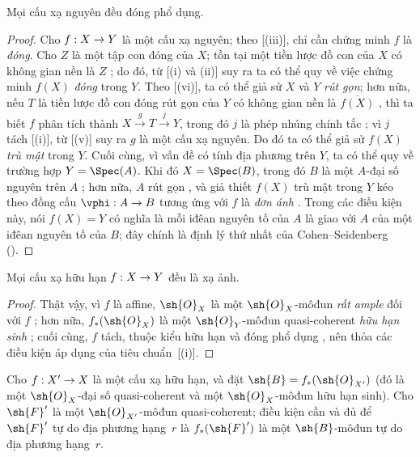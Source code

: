\documentclass[oneside,10pt]{amsart}
\makeatletter
\newcommand{\ega@arrow}[2]{\mathchoice{#1}{#2}{#2}{#2}}
\renewcommand{\to}{\ega@arrow{\longrightarrow}{\rightarrow}}
\newcommand{\oldpage}[2][]{\marginnote{\normalfont\footnotesize\textbf{#1}~|~#2}\ignorespaces}
\let\EGAOriginalLabel\label
\renewcommand{\label}[1]{\phantomsection\EGAOriginalLabel{#1}}
\makeatother
\begin{document}
\begin{proposition}[6.1.10]
\label{II.6.1.10}
Mọi cấu xạ nguyên đều đóng phổ dụng.
\end{proposition}

\begin{proof}
Cho $f:X\to Y$ là một cấu xạ nguyên;
theo [(iii)], chỉ cần chứng minh $f$ là \emph{đóng}.
Cho $Z$ là một tập con đóng của $X$;
\oldpage[II]{113}
tồn tại một tiền lược đồ con của $X$ có không gian nền là $Z$ ; do đó, từ [(i) và (ii)] suy ra ta có thể quy về việc chứng minh $f(X)$ \emph{đóng} trong $Y$.
Theo [(vi)], ta có thể giả sử $X$ và $Y$ \emph{rút gọn};
hơn nữa, nếu $T$ là tiền lược đồ con đóng rút gọn của $Y$ có không gian nền là $\overline{f(X)}$ , thì ta biết $f$ phân tích thành $X\xrightarrow{g}T\xrightarrow{j}Y$, trong đó $j$ là phép nhúng chính tắc ; vì $j$ tách [(i)], từ [(v)] suy ra $g$ là một cấu xạ nguyên.
Do đó ta có thể giả sử $f(X)$ \emph{trù mật} trong $Y$.
Cuối cùng, vì vấn đề có tính địa phương trên $Y$, ta có thể quy về trường hợp $Y=\Spec(A)$.
Khi đó $X=\Spec(B)$, trong đó $B$ là một $A$-đại số nguyên trên $A$ ;
hơn nữa, $A$ rút gọn , và giả thiết $f(X)$ trù mật trong $Y$ kéo theo đồng cấu $\vphi:A\to B$ tương ứng với $f$ là \emph{đơn ánh} .
Trong các điều kiện này, nói $f(X)=Y$ có nghĩa là mỗi iđêan nguyên tố của $A$ là giao với $A$ của một iđêan nguyên tố của $B$; đây chính là định lý thứ nhất của Cohen--Seidenberg (\cite[t.~I, p.~257, th.~3]{I-13}).
\end{proof}

\begin{corollary}[6.1.11]
\label{II.6.1.11}
Mọi cấu xạ hữu hạn $f:X\to Y$ đều là xạ ảnh.
\end{corollary}

\begin{proof}
Thật vậy, vì $f$ là affine, $\sh{O}_X$ là một $\sh{O}_X$-môđun \emph{rất ample} đối với $f$ ;
hơn nữa, $f_*(\sh{O}_X)$ là một $\sh{O}_Y$-môđun quasi-coherent \emph{hữu hạn sinh} ;
cuối cùng, $f$ tách, thuộc kiểu hữu hạn và đóng phổ dụng , nên thỏa các điều kiện áp dụng của tiêu chuẩn~[(i)].
\end{proof}

\begin{proposition}[6.1.12]
\label{II.6.1.12}
Cho $f:X'\to X$ là một cấu xạ hữu hạn, và đặt $\sh{B}=f_*(\sh{O}_{X'})$ (đó là một $\sh{O}_X$-đại số quasi-coherent và một $\sh{O}_X$-môđun hữu hạn sinh).
Cho $\sh{F}'$ là một $\sh{O}_{X'}$-môđun quasi-coherent;
điều kiện cần và đủ để $\sh{F}'$ tự do địa phương hạng~$r$ là $f_*(\sh{F}')$ là một $\sh{B}$-môđun tự do địa phương hạng~$r$.
\end{proposition}
\end{document}
